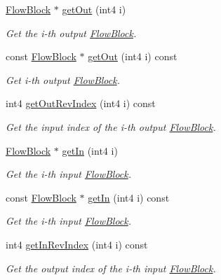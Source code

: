 \begin{DoxyCompactItemize}
\mbox{\hyperlink{class_flow_block}{Flow\+Block}} $\ast$ \mbox{\hyperlink{class_flow_block_ab95b430d4c8470c379dba93613c3073b}{get\+Out}} (int4 i)
\begin{DoxyCompactList}\small\item\em Get the i-\/th output \mbox{\hyperlink{class_flow_block}{Flow\+Block}}. \end{DoxyCompactList}\item 
const \mbox{\hyperlink{class_flow_block}{Flow\+Block}} $\ast$ \mbox{\hyperlink{class_flow_block_a23c0935d91e6bc4e8eef2f78b158bb9a}{get\+Out}} (int4 i) const
\begin{DoxyCompactList}\small\item\em Get i-\/th output \mbox{\hyperlink{class_flow_block}{Flow\+Block}}. \end{DoxyCompactList}\item 
int4 \mbox{\hyperlink{class_flow_block_a7ebfd2366874120b2d582313386cc28f}{get\+Out\+Rev\+Index}} (int4 i) const
\begin{DoxyCompactList}\small\item\em Get the input index of the i-\/th output \mbox{\hyperlink{class_flow_block}{Flow\+Block}}. \end{DoxyCompactList}\item 
\mbox{\hyperlink{class_flow_block}{Flow\+Block}} $\ast$ \mbox{\hyperlink{class_flow_block_acbb1f895710c8339bd21d9c7a3200322}{get\+In}} (int4 i)
\begin{DoxyCompactList}\small\item\em Get the i-\/th input \mbox{\hyperlink{class_flow_block}{Flow\+Block}}. \end{DoxyCompactList}\item 
const \mbox{\hyperlink{class_flow_block}{Flow\+Block}} $\ast$ \mbox{\hyperlink{class_flow_block_acb3aa734493ac5920c0c76f7069a67b7}{get\+In}} (int4 i) const
\begin{DoxyCompactList}\small\item\em Get the i-\/th input \mbox{\hyperlink{class_flow_block}{Flow\+Block}}. \end{DoxyCompactList}\item 
int4 \mbox{\hyperlink{class_flow_block_ad2fda4d5ab45b5a7f63b5632139a2868}{get\+In\+Rev\+Index}} (int4 i) const
\begin{DoxyCompactList}\small\item\em Get the output index of the i-\/th input \mbox{\hyperlink{class_flow_block}{Flow\+Block}}. \end{DoxyCompactList}\item 

\end{DoxyCompactItemize}
